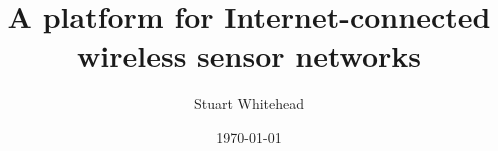 \author{Stuart Whitehead}
\title{A platform for Internet-connected wireless sensor networks}
\date{\today}
\maketitle